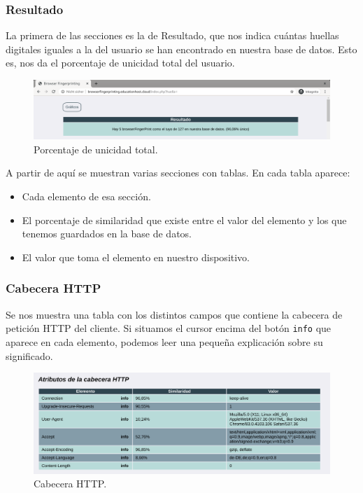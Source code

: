 \subsubsection{Resultado}
La primera de las secciones es la de Resultado, que nos indica cuántas huellas digitales iguales a la del usuario se han encontrado en nuestra base de datos. Esto es, nos da el porcentaje de unicidad total del usuario. \par

\begin{figure}[H]
	\centering
	\includegraphics[width=1\textwidth]{Images/resultadoSection.png}
	\caption{Porcentaje de unicidad total.}
	\label{fig:resultadoSection}
\end{figure}

A partir de aquí se muestran varias secciones con tablas. En cada tabla aparece:
\begin{itemize}
	\item Cada elemento de esa sección.
	\item El porcentaje de similaridad que existe entre el valor del elemento y los que tenemos guardados en la base de datos.
	\item El valor que toma el elemento en nuestro dispositivo.
\end{itemize}

\subsubsection{Cabecera HTTP}
Se nos muestra una tabla con los distintos campos que contiene la cabecera de petición HTTP del cliente. Si situamos el cursor encima del botón \texttt{info} que aparece en cada elemento, podemos leer una pequeña explicación sobre su significado.

\begin{figure}[H]
	\centering
	\includegraphics[width=1\textwidth]{Images/headersSection.png}
	\caption{Cabecera HTTP.}
	\label{fig:headersSection}
\end{figure}

